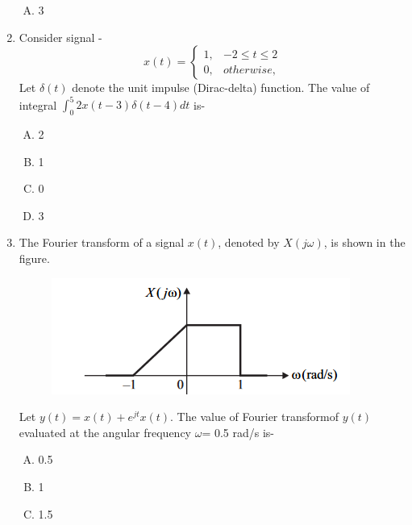 \documentclass[journal,12pt,twocolumn]{IEEEtran}
\begin{document}
\begin{enumerate}
\begin{enumerate}[(A)]
\item 3

\end{enumerate}
\item Consider signal -
\[
	x(t)=\begin{cases}
		1, &  {-2\leq t \leq 2}  \\
		0, &   otherwise,
	\end{cases}
\]
Let $\delta(t)$ denote the unit impulse (Dirac-delta) function. The value of integral $ {\int_{0}^{5} 2x(t-3)\delta(t-4) }dt $ is-

\begin{enumerate}[(A)]

\setlength\itemsep{0.5em}

\item 2
\item 1

\item 0

\item 3

\end{enumerate}
\item The Fourier transform of a signal $x(t)$, denoted by $X(j\omega)$, is shown in the figure.
\begin{figure}[!ht]
\begin{center}
\includegraphics[width=1.2\columnwidth]{./gate_2}
\end{center}
\label{fig:gate_2}	
\end{figure}
Let $y(t)=x(t)+e^{jt}x(t)$. The value of Fourier transformof $y(t)$ evaluated at the angular frequency $\omega$= 0.5 rad/s is-
\begin{enumerate}[(A)]

\setlength\itemsep{0.5em}

\item 0.5
\item 1

\item 1.5


\end{enumerate}
\end{enumerate}
\end{document}
